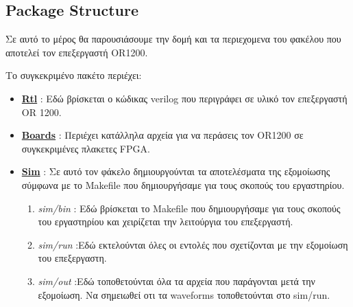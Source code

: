 \documentclass[a4paper,10pt]{article}
\numberwithin{figure}{section}
\numberwithin{table}{section}
\begin{document}
{{}



\subsection{Package Structure}{
Σε αυτό το μέρος θα παρουσιάσουμε την δομή και τα περιεχομενα του φακέλου που αποτελεί 
τον επεξεργαστή OR1200.

Το συγκεκριμένο πακέτο περιέχει:
\begin{itemize}
 \item \underline{{\bf Rtl}} : Εδώ βρίσκεται ο κώδικας verilog που περιγράφει σε υλικό τον επεξεργαστή OR 1200.
\item \underline{{\bf Boards}} : Περιέχει κατάλληλα αρχεία για να περάσεις τον OR1200 σε συγκεκριμένες πλακετες
FPGA.
\item \underline{{\bf Sim}} : Σε αυτό τον φάκελο δημιουργούνται τα αποτελέσματα της εξομοίωσης σύμφωνα με
το Makefile που δημιουργήσαμε για τους σκοπούς του εργαστηρίου. \begin{enumerate}
                                                                 \item \emph{sim/bin} : Εδώ βρίσκεται το Makefile που δημιουργήσαμε για τους σκοπούς του
εργαστηρίου και χειρίζεται την λειτούργια του επεξεργαστή.
                                                                 \item \emph{sim/run} :Εδώ εκτελούνται όλες οι εντολές που σχετίζονται με την εξομοίωση
του επεξεργαστη.
                                                                 \item \emph{sim/out} :Εδώ τοποθετούνται όλα τα αρχεία που παράγονται μετά την εξομοίωση.
Να σημειωθεί οτι τα waveforms τοποθετούνται στο sim/run.
                                                                \end{enumerate}


\end{itemize}}}
\end{document}
